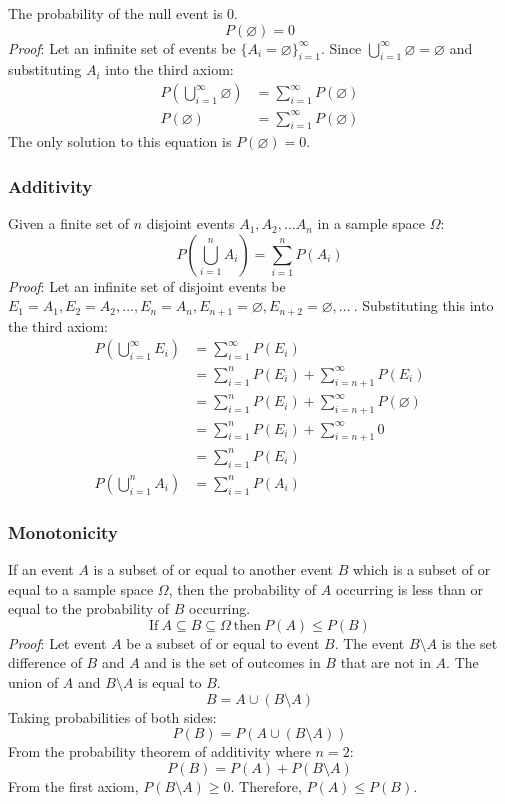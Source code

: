 \documentclass{article}
\begin{document}
The probability of the null event is 0.
\[P(\varnothing)=0\]
\textit{Proof}: Let an infinite set of events be $\{A_i=\varnothing \}_{i=1}^\infty$. Since $\bigcup_{i=1}^\infty \varnothing = \varnothing$ and substituting $A_i$ into the third axiom:
\begin{equation*}
\begin{split}
P(\bigcup_{i=1}^\infty \varnothing) & = \sum_{i=1}^\infty P(\varnothing) \\
P(\varnothing) & = \sum_{i=1}^\infty P(\varnothing)
\end{split}
\end{equation*}
The only solution to this equation is $P(\varnothing)=0$.

\subsubsection{Additivity}

Given a finite set of $n$ disjoint events ${A_1, A_2, ... A_n}$ in a sample space $\Omega$:
\[P(\bigcup_{i=1}^n A_i) = \sum_{i=1}^n P(A_i)\]
\textit{Proof}: Let an infinite set of disjoint events be $E_1 = A_1, E_2 = A_2, ... , E_n = A_n, E_{n+1} = \varnothing, E_{n+2} = \varnothing, ... \ $. Substituting this into the third axiom:
\begin{equation*}
\begin{split}
P(\bigcup_{i=1}^\infty E_i) & = \sum_{i=1}^\infty P(E_i) \\
 & =\sum_{i=1}^n P(E_i) + \sum_{i=n+1}^\infty P(E_i) \\
 & =\sum_{i=1}^n P(E_i) + \sum_{i=n+1}^\infty P(\varnothing) \\
 & =\sum_{i=1}^n P(E_i) + \sum_{i=n+1}^\infty 0 \\
 & =\sum_{i=1}^n P(E_i) \\
P(\bigcup_{i=1}^n A_i) & = \sum_{i=1}^n P(A_i)
\end{split}
\end{equation*}

\subsubsection{Monotonicity}

If an event $A$ is a subset of or equal to another event $B$ which is a subset of or equal to a sample space $\Omega$, then the probability of $A$ occurring is less than or equal to the probability of $B$ occurring.
\[\mathrm{If} \ A \subseteq B \subseteq \Omega \ \mathrm{then} \ P(A) \leq P(B)\]
\textit{Proof}: Let event $A$ be a subset of or equal to event $B$. The event $B \setminus A$ is the set difference of $B$ and $A$ and is the set of outcomes in $B$ that are not in $A$. The union of $A$ and $B \setminus A$ is equal to $B$.
\[B=A \cup (B \setminus A)\]
Taking probabilities of both sides:
\[P(B)=P(A \cup (B \setminus A))\]
From the probability theorem of additivity where $n=2$:
\[P(B)=P(A) + P(B \setminus A)\]
From the first axiom, $P(B \setminus A) \geq 0$. Therefore, $P(A) \leq P(B)$. 
\end{document}
